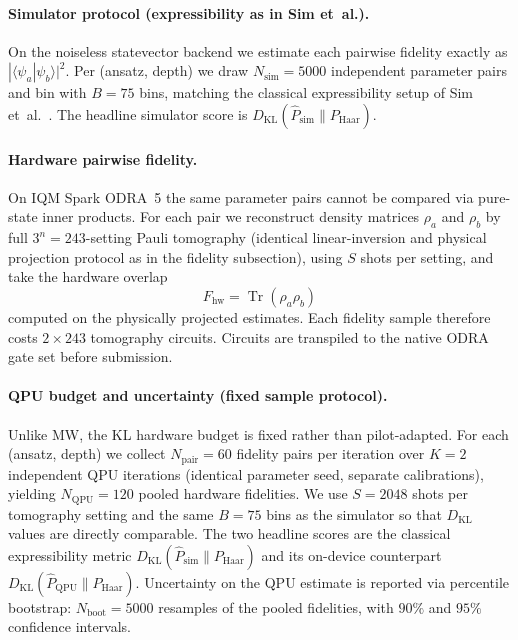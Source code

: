 \documentclass[letterpaper]{article} %
\begin{document}
\paragraph{Simulator protocol (expressibility as in Sim et~al.).}
On the noiseless statevector backend we estimate each pairwise fidelity exactly
as $|\langle\psi_a|\psi_b\rangle|^2$.
Per (ansatz, depth) we draw $N_{\mathrm{sim}}=5000$ independent parameter pairs
and bin with $B=75$ bins, matching the classical expressibility setup of
Sim et~al.~\cite{sim2019}.
The headline simulator score is
$D_{\mathrm{KL}}(\hat P_{\mathrm{sim}}\|P_{\mathrm{Haar}})$.

\paragraph{Hardware pairwise fidelity.}
On IQM Spark ODRA~5 the same parameter pairs cannot be compared via pure-state
inner products.
For each pair we reconstruct density matrices $\rho_a$ and $\rho_b$ by full
$3^n=243$-setting Pauli tomography (identical linear-inversion and physical
projection protocol as in the fidelity subsection), using $S$ shots per setting,
and take the hardware overlap
\begin{equation}
  F_{\mathrm{hw}}
  =
  \operatorname{Tr}(\rho_a\rho_b)
  \label{eq:hw-pairwise-fidelity}
\end{equation}
computed on the physically projected estimates.
Each fidelity sample therefore costs $2\times 243$ tomography circuits.
Circuits are transpiled to the native ODRA gate set before submission.

\paragraph{QPU budget and uncertainty (fixed sample protocol).}
Unlike MW, the KL hardware budget is fixed rather than pilot-adapted.
For each (ansatz, depth) we collect $N_{\mathrm{pair}}=60$ fidelity pairs per
iteration over $K=2$ independent QPU iterations (identical parameter seed,
separate calibrations), yielding $N_{\mathrm{QPU}}=120$ pooled hardware
fidelities.
We use $S=2048$ shots per tomography setting and the same $B=75$ bins as the
simulator so that $D_{\mathrm{KL}}$ values are directly comparable.
The two headline scores are the classical expressibility metric
$D_{\mathrm{KL}}(\hat P_{\mathrm{sim}}\|P_{\mathrm{Haar}})$ and its on-device
counterpart $D_{\mathrm{KL}}(\hat P_{\mathrm{QPU}}\|P_{\mathrm{Haar}})$.
Uncertainty on the QPU estimate is reported via percentile bootstrap:
$N_{\mathrm{boot}}=5000$ resamples of the pooled fidelities, with $90\%$ and
$95\%$ confidence intervals.
\end{document}
